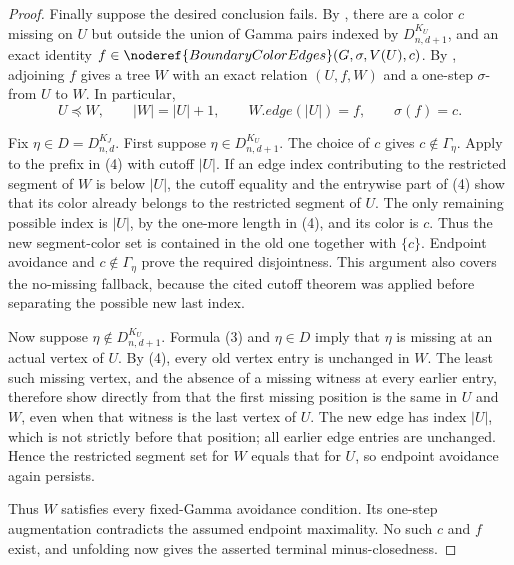 \begin{proof}
Finally suppose the desired  conclusion
fails.  By , there are a color $c$ missing on
$U$ but outside the union of Gamma pairs indexed by
$D^{K_U}_{n,d+1}$, and an exact identity
$f\in\noderef{BoundaryColorEdges}(G,\sigma,V(U),c)$.  By
, adjoining $f$ gives a tree
$W$ with an exact relation
$(U,f,W)$ and a one-step
$\sigma$- from $U$ to $W$.  In particular,
\[
 U\preccurlyeq W,\qquad |W|=|U|+1,
 \qquad W.\mathit{edge}(|U|)=f,\qquad \sigma(f)=c.           \tag{4}
\]

Fix $\eta\in D=D^{K_J}_{n,d}$.  First suppose
$\eta\in D^{K_U}_{n,d+1}$.  The choice of $c$ gives
$c\notin\Gamma_\eta$.  Apply
 to the prefix in (4)
with cutoff $|U|$.  If an edge index contributing to the restricted segment
of $W$ is below $|U|$, the cutoff equality and the entrywise part of (4)
show that its color already belongs to the restricted segment of $U$.
The only remaining possible index is $|U|$, by the one-more length in (4),
and its color is $c$.  Thus the new segment-color set is contained in the
old one together with $\{c\}$.  Endpoint avoidance and
$c\notin\Gamma_\eta$ prove the required disjointness.  This argument also
covers the no-missing fallback, because the cited cutoff theorem was
applied before separating the possible new last index.

Now suppose $\eta\notin D^{K_U}_{n,d+1}$.  Formula (3) and
$\eta\in D$ imply that $\eta$ is missing at an actual vertex of $U$.
By (4), every old vertex entry is unchanged in $W$.  The least such
missing vertex, and the absence of a missing witness at every earlier
entry, therefore show directly from
 that the first missing position is
the same in $U$ and $W$, even when that witness is the last vertex of $U$.
The new edge has index $|U|$, which is not strictly before that position;
all earlier edge entries are unchanged.  Hence the restricted segment set
for $W$ equals that for $U$, so endpoint avoidance again persists.

Thus $W$ satisfies every fixed-Gamma avoidance condition.  Its one-step
augmentation contradicts the assumed endpoint maximality.  No such $c$
and $f$ exist, and unfolding  now gives
the asserted terminal minus-closedness.
\end{proof}
